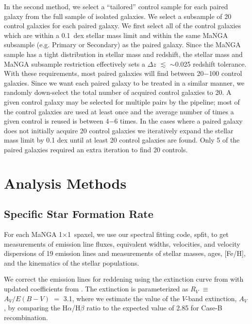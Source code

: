 \documentclass[iop,revtex4,twocolumn,apj,numberedappendix,appendixfloats]{emulateapj}
\begin{document}
In the second method, we select a ``tailored'' control sample for each paired galaxy from the full sample of isolated galaxies. We select a subsample of 20 control galaxies for each paired galaxy. We first select all of the control galaxies which are within a 0.1~dex stellar mass limit and within the same MaNGA subsample (e.g. Primary or Secondary) as the paired galaxy. Since the MaNGA sample has a tight distribution in stellar mass and redshift, the stellar mass and MaNGA subsample restriction effectively sets a $\Delta z$ $\lesssim$ $\sim$0.025 redshift tolerance. With these requirements, most paired galaxies will find between 20$-$100 control galaxies. Since we want each paired galaxy to be treated in a similar manner, we randomly down-select the total number of acquired control galaxies to 20. A given control galaxy may be selected for multiple pairs by the pipeline; most of the control galaxies are used at least once and the average number of times a given control is reused is between 4$-$6 times. In the cases where a paired galaxy does not initially acquire 20 control galaxies we iteratively expand the stellar mass limit by 0.1 dex until at least 20 control galaxies are found. Only 5 of the paired galaxies required an extra iteration to find 20 controls. 

\section{Analysis Methods}\label{sec:analysis}

\subsection{Specific Star Formation Rate}

For each MaNGA 1\arcsec$\times$1\arcsec\ spaxel, we use our spectral fitting code, {\sc spfit}, to get measurements of emission line fluxes, equivalent widths, velocities, and velocity dispersions of 19 emission lines and measurements of stellar masses, ages, [Fe/H], and the kinematics of the stellar populations. 

We correct the emission lines for reddening using the extinction curve from \citet{Cardelli:1989} with updated coefficients from \citet{ODonnell:1994}. The extinction is parameterized as $R_V$ $\equiv$ $A_V/E(B-V)$ $=$ 3.1, where we estimate the value of the $V$-band extinction, $A_V$, by comparing the H$\alpha$/H$\beta$ ratio to the expected value of 2.85 for Case-B recombination. 
\end{document}
